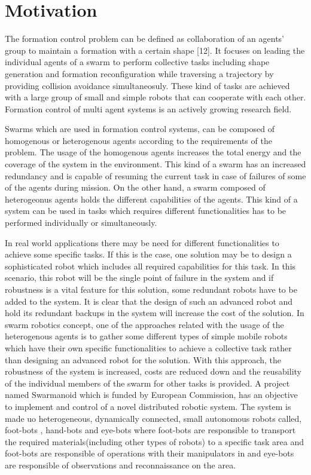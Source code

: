 \section{Motivation}

The formation control problem can be defined as collaboration of an agents' group to maintain a formation with a certain shape [12]. It focuses on leading the individual agents of a swarm to perform  collective tasks including shape generation and formation reconfiguration while traversing a trajectory by providing collision avoidance simultaneosuly. These kind of tasks are achieved with a large group of small and simple robots  that can cooperate with each other. Formation control of multi agent systems  is an actively growing research field.\newline 

Swarms which are used in formation control systems, can be composed of homogenous or heterogenous agents according to the requirements of the problem. The usage of the homogenous agents increases the total energy and the coverage of the system in the environment. This kind of a swarm has an increased redundancy and is capable of resuming the current task in case of failures of some of the agents during mission. On the other hand, a swarm composed of heterogeonus agents holds the different capabilities of the agents. This kind of a system can be used in tasks which requires different functionalities has to be performed individually or simultaneously.\newline

In real world applications there may be need for different  functionalities to achieve some specific tasks. If this is the case, one solution may be to design a sophisticated robot which includes all required capabilities for this task. In this scenario, this robot will be the single point of failure in the system and if robustness is a  vital feature for this solution, some redundant robots have to be added to the system. It is clear that the design of such an advanced robot and hold its redundant backups in the system will increase the cost of the solution. In swarm robotics concept, one of the approaches related with the usage of the heterogenous agents is to gather some different types of simple mobile robots which have their own specific functionalities to achieve a collective task rather than designing an advanced robot for the solution. With this approach, the robustness of the system is increased, costs are reduced down and the reusability of the individual members of the swarm for other tasks is provided.  A project named Swarmanoid which is funded by European Commission, has an objective to implement and control of a novel distributed robotic system. The system is made uo heterogeneous, dynamically connected, small autonomous robots called,  foot-bots , hand-bots and eye-bots where foot-bots are responsible to transport the required materials(including other types of robots) to a specific task area and foot-bots are responsible of operations with their manipulators in and eye-bots are responsible of observations and reconnaissance on the area.

